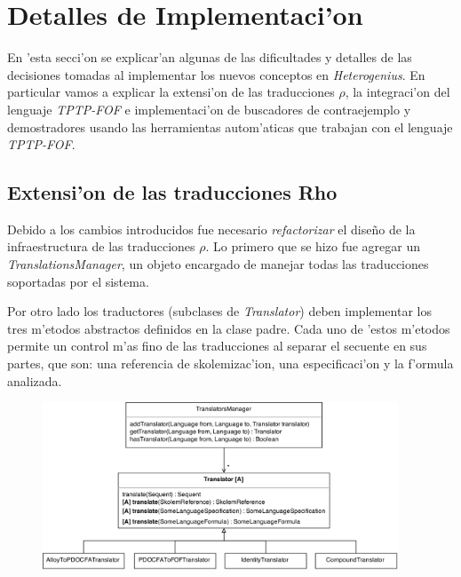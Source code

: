 \section{Detalles de Implementaci'on}

En 'esta secci'on se explicar'an algunas de las dificultades y detalles de las decisiones tomadas al implementar los nuevos conceptos en \textit{Heterogenius}. En particular vamos a explicar la extensi'on de las traducciones $\rho$, la integraci'on del lenguaje \textit{TPTP-FOF} e implementaci'on de buscadores de contraejemplo y demostradores usando las herramientas autom'aticas que trabajan con el lenguaje \textit{TPTP-FOF}.

\subsection{Extensi'on de las traducciones Rho}


Debido a los cambios introducidos fue necesario \textit{refactorizar} el diseño de la infraestructura de las traducciones $\rho$. Lo primero que se hizo fue agregar un \textit{TranslationsManager}, un objeto encargado de manejar todas las traducciones soportadas por el sistema. 

Por otro lado los traductores (subclases de \textit{Translator}) deben implementar los tres m'etodos  abstractos definidos en la clase padre. Cada uno de 'estos m'etodos permite un control m'as fino de las traducciones al separar el secuente en sus partes, que son: una referencia de skolemizac'ion, una especificaci'on y la f'ormula analizada.

\begin{figure}[H]
	\includegraphics[width=400px, angle=90]{img/arq_traductores.png}
\end{figure}

